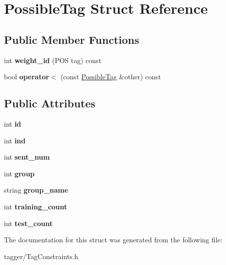 \hypertarget{struct_possible_tag}{
\section{PossibleTag Struct Reference}
\label{struct_possible_tag}
}
\subsection*{Public Member Functions}
\begin{DoxyCompactItemize}
\item 
\hypertarget{struct_possible_tag_a63f51fa07de58355955633c1fc5ec5c7}{
int {\bfseries weight\_\-id} (POS tag) const }
\label{struct_possible_tag_a63f51fa07de58355955633c1fc5ec5c7}

\item 
\hypertarget{struct_possible_tag_a83442edca34aefb4376d36dee744a28b}{
bool {\bfseries operator$<$} (const \hyperlink{struct_possible_tag}{PossibleTag} \&other) const }
\label{struct_possible_tag_a83442edca34aefb4376d36dee744a28b}

\end{DoxyCompactItemize}
\subsection*{Public Attributes}
\begin{DoxyCompactItemize}
\item 
\hypertarget{struct_possible_tag_a8c69b59e1e75a5f80623cce26baacabb}{
int {\bfseries id}}
\label{struct_possible_tag_a8c69b59e1e75a5f80623cce26baacabb}

\item 
\hypertarget{struct_possible_tag_a822aff1087d9f91882bf45da7f129e75}{
int {\bfseries ind}}
\label{struct_possible_tag_a822aff1087d9f91882bf45da7f129e75}

\item 
\hypertarget{struct_possible_tag_a26244f2c445f233652e4c3ffebafa894}{
int {\bfseries sent\_\-num}}
\label{struct_possible_tag_a26244f2c445f233652e4c3ffebafa894}

\item 
\hypertarget{struct_possible_tag_a25eb72efa84dc8e030a928c091391609}{
int {\bfseries group}}
\label{struct_possible_tag_a25eb72efa84dc8e030a928c091391609}

\item 
\hypertarget{struct_possible_tag_afcfa2ffd67a92a564d5c16aa3945b8a0}{
string {\bfseries group\_\-name}}
\label{struct_possible_tag_afcfa2ffd67a92a564d5c16aa3945b8a0}

\item 
\hypertarget{struct_possible_tag_adc65412fc67deda1ac5554fdbb0264d2}{
int {\bfseries training\_\-count}}
\label{struct_possible_tag_adc65412fc67deda1ac5554fdbb0264d2}

\item 
\hypertarget{struct_possible_tag_ae933b21144c99f1197a5254e8ceb1c7c}{
int {\bfseries test\_\-count}}
\label{struct_possible_tag_ae933b21144c99f1197a5254e8ceb1c7c}

\end{DoxyCompactItemize}


The documentation for this struct was generated from the following file:\begin{DoxyCompactItemize}
\item 
tagger/TagConstraints.h\end{DoxyCompactItemize}
